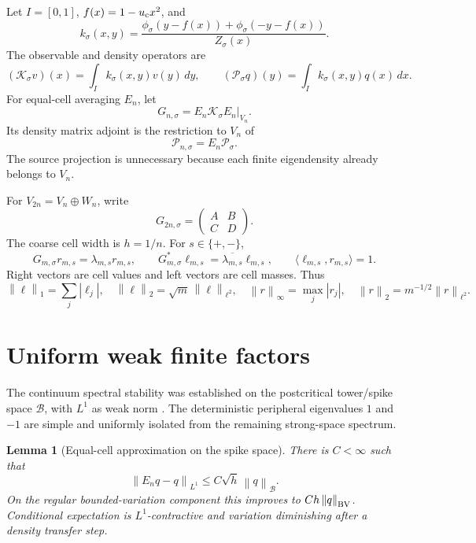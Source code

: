 \documentclass[11pt]{article}
\newtheorem{lemma}[theorem]{Lemma}
\theoremstyle{remark}
\newcommand{\cB}{\mathcal B}
\newcommand{\cK}{\mathcal K}
\newcommand{\cP}{\mathcal P}
\newcommand{\norm}[1]{\left\lVert #1\right\rVert}
\begin{document}
Let \(I=[0,1]\), \(f(x)=1-u_{\rm c}x^2\), and
\[
 k_\sigma(x,y)=
 \frac{\phi_\sigma(y-f(x))+\phi_\sigma(-y-f(x))}
 {Z_\sigma(x)}.
\]
The observable and density operators are
\[
 (\cK_\sigma v)(x)=\int_I k_\sigma(x,y)v(y)\,dy,\qquad
 (\cP_\sigma q)(y)=\int_I k_\sigma(x,y)q(x)\,dx.
\]
For equal-cell averaging \(E_n\), let
\[
 G_{n,\sigma}=E_n\cK_\sigma E_n\big|_{V_n}.
\]
Its density matrix adjoint is the restriction to \(V_n\) of
\begin{equation}
 \cP_{n,\sigma}=E_n\cP_\sigma.
 \label{eq:density-extension}
\end{equation}
The source projection is unnecessary because each finite eigendensity
already belongs to \(V_n\).

For \(V_{2n}=V_n\oplus W_n\), write
\[
 G_{2n,\sigma}=\begin{pmatrix}A&B\\C&D\end{pmatrix}.
\]
The coarse cell width is \(h=1/n\).  For \(s\in\{+,-\}\),
\[
 G_{m,\sigma}r_{m,s}=\lambda_{m,s}r_{m,s},\qquad
 G_{m,\sigma}^*\ell_{m,s}
 =\overline{\lambda_{m,s}}\ell_{m,s},\qquad
 \langle\ell_{m,s},r_{m,s}\rangle=1.
\]
Right vectors are cell values and left vectors are cell masses.  Thus
\[
 \norm{\ell}_1=\sum_j|\ell_j|,\quad
 \norm{\ell}_2=\sqrt m\,\norm{\ell}_{\ell^2},\quad
 \norm r_\infty=\max_j|r_j|,\quad
 \norm r_2=m^{-1/2}\norm r_{\ell^2}.
\]

\section{Uniform weak finite factors}

The continuum spectral stability was established on the postcritical
tower/spike space \(\cB\), with \(L^1\) as weak norm
\citep{WangBoundaryLayer2026,WangLogConditioning2026}.  The deterministic
peripheral eigenvalues \(1\) and \(-1\) are simple and uniformly isolated
from the remaining strong-space spectrum.

\begin{lemma}[Equal-cell approximation on the spike space]
\label{lem:cell-spike}
There is \(C<\infty\) such that
\begin{equation}
 \norm{E_nq-q}_{L^1}\le C\sqrt h\,\norm q_{\cB}.
 \label{eq:spike-cell-error}
\end{equation}
On the regular bounded-variation component this improves to
\(Ch\norm q_{\rm BV}\).  Conditional expectation is \(L^1\)-contractive
and variation diminishing after a density transfer step.
\end{lemma}
\end{document}
